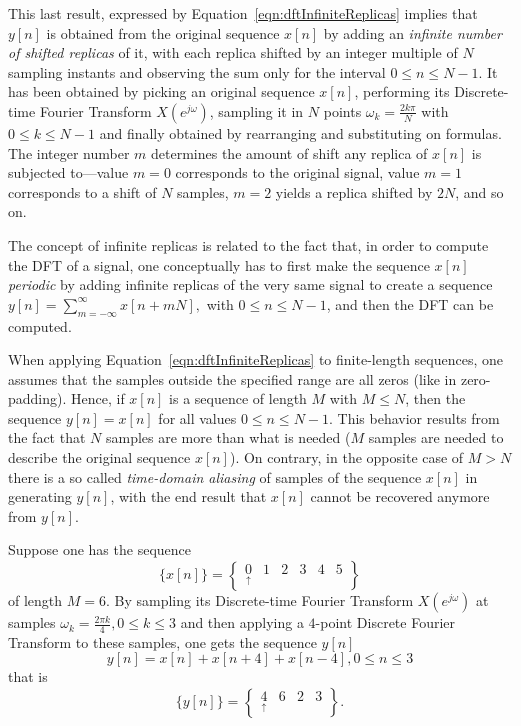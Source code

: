\documentclass[\documentfontsize, twocolumn]{\classname}
\begin{document}
This last result, expressed by Equation~\ref{eqn:dftInfiniteReplicas} implies that $y[n]$ is obtained from the original sequence $x[n]$ by adding an \emph{infinite number of shifted replicas} of it, with each replica shifted by an integer multiple of $N$ sampling instants and observing the sum only for the interval $0 \leq n \leq N-1$. It has been obtained by picking an original sequence $x[n]$, performing its Discrete-time Fourier Transform $X(e^{j\omega})$, sampling it in $N$ points $\omega_k = \frac{2k\pi}{N}$ with $0 \leq k \leq N-1$ and finally obtained by rearranging and substituting on formulas. The integer number $m$ determines the amount of shift any replica of $x[n]$ is subjected to---value $m=0$ corresponds to the original signal, value $m=1$ corresponds to a shift of $N$ samples, $m=2$ yields a replica shifted by $2N$, and so on.

The concept of infinite replicas is related to the fact that, in order to compute the DFT of a signal, one conceptually has to first make the sequence $x[n]$ \emph{periodic} by adding infinite replicas of the very same signal to create a sequence $y[n] = \sum_{m=-\infty}^{\infty} x[n + mN],$ with $0 \leq n \leq N-1$, and then the DFT can be computed.

When applying Equation~\ref{eqn:dftInfiniteReplicas} to finite-length sequences, one assumes that the samples outside the specified range are all zeros (like in zero-padding). Hence, if $x[n]$ is a sequence of length $M$ with $M \leq N$, then the sequence $y[n] = x[n]$ for all values $0 \leq n \leq N-1$. This behavior results from the fact that $N$ samples are more than what is needed ($M$ samples are needed to describe the original sequence $x[n]$). On contrary, in the opposite case of $M > N$ there is a so called \emph{time-domain aliasing} of samples of the sequence $x[n]$ in generating $y[n]$, with the end result that $x[n]$ cannot be recovered anymore from $y[n]$.

Suppose one has the sequence 
\[\{x[n]\} = \begin{Bmatrix} \underset{\uparrow}{0} & 1 & 2 & 3 & 4 & 5\end{Bmatrix}\]
of length $M=6$. By sampling its Discrete-time Fourier Transform $X(e^{j\omega})$ at samples $\omega_k = \frac{2\pi k}{4}, 0 \leq k \leq 3$ and then applying a $4$-point Discrete Fourier Transform to these samples, one gets the sequence $y[n]$
\[
    y[n] = x[n] + x[n+4] + x[n-4], 0 \leq n \leq 3
\]
that is
\[
    \{y[n]\} = \begin{Bmatrix}\underset{\uparrow}{4} & 6 & 2 & 3\end{Bmatrix}.
\]
\end{document}
